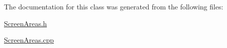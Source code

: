 The documentation for this class was generated from the following files:\begin{DoxyCompactItemize}
\item 
\hyperlink{ScreenAreas_8h}{ScreenAreas.h}\item 
\hyperlink{ScreenAreas_8cpp}{ScreenAreas.cpp}\end{DoxyCompactItemize}
